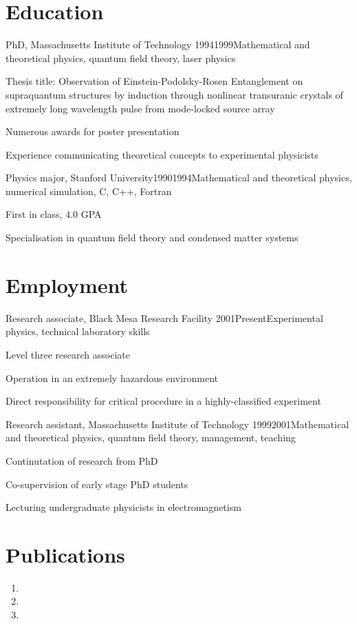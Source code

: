 \documentclass{resumay}
\begin{document}
\maketitle

\section{Education}

\begin{positionlist}{PhD, Massachusetts Institute of Technology
  }{1994}{1999}{Mathematical and theoretical physics, quantum field theory,
  laser physics}
  \item Thesis title: Observation of Einstein-Podolsky-Rosen Entanglement on
    supraquantum structures by induction through nonlinear transuranic crystals
    of extremely long wavelength pulse from mode-locked source array
  \item Numerous awards for poster presentation
  \item Experience communicating theoretical concepts to experimental physicists
\end{positionlist}

\begin{positionlist}{Physics major, Stanford
  University}{1990}{1994}{Mathematical and theoretical physics, numerical
  simulation, C, C++, Fortran}
  \item First in class, 4.0 GPA
  \item Specialisation in quantum field theory and condensed matter systems
\end{positionlist}

\section{Employment}

\begin{positionlist}{Research associate, Black Mesa Research Facility
  }{2001}{Present}{Experimental physics, technical laboratory skills}
  \item Level three research associate
  \item Operation in an extremely hazardous environment
  \item Direct responsibility for critical procedure in a highly-classified
    experiment
\end{positionlist}

\begin{positionlist}{Research assistant, Massachusetts Institute of Technology
  }{1999}{2001}{Mathematical and theoretical physics, quantum field theory,
  management, teaching}
  \item Continutation of research from PhD
  \item Co-supervision of early stage PhD students
  \item Lecturing undergraduate physicists in electromagnetism
\end{positionlist}

\section{Publications}


\begin{enumerate}
  \item[] 
  \item[] 
  \item[] 
\end{enumerate}
\end{document}
